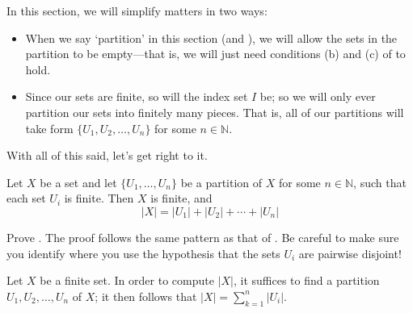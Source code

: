 \rdefPartition*

In this section, we will simplify matters in two ways:
\begin{itemize}
\item When we say `partition' in this section (and ), we will allow the sets in the partition to be empty---that is, we will just need conditions (b) and (c) of  to hold.
\item Since our sets are finite, so will the index set $I$ be; so we will only ever partition our sets into finitely many pieces. That is, all of our partitions will take form $\{ U_1, U_2, \dots, U_n \}$ for some $n \in \mathbb{N}$.
\end{itemize}

With all of this said, let's get right to it.

\begin{theorem}
\label{thmAdditionPrinciple}
Let $X$ be a set and let $\{ U_1, \dots, U_n \}$ be a partition of $X$ for some $n \in \mathbb{N}$, such that each set $U_i$ is finite. Then $X$ is finite, and
\[ |X| = |U_1| + |U_2| + \cdots + |U_n| \]
\end{theorem}

\begin{exercise}
Prove . The proof follows the same pattern as that of . Be careful to make sure you identify where you use the hypothesis that the sets $U_i$ are pairwise disjoint!
\end{exercise}

\begin{strategy}
\label{strAdditionPrinciple}
Let $X$ be a finite set. In order to compute $|X|$, it suffices to find a partition $U_1, U_2, \dots, U_n$ of $X$; it then follows that $|X| = \sum_{k=1}^n |U_i|$.
\end{strategy}

